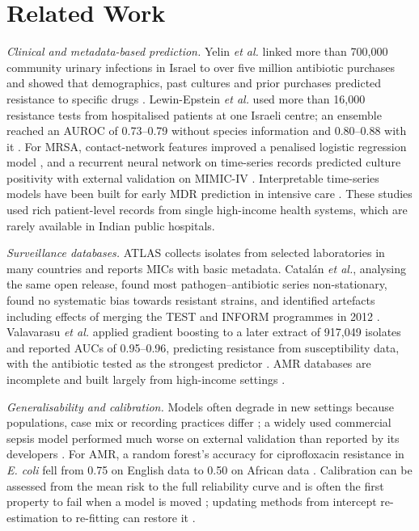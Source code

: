 \documentclass[conference]{IEEEtran}
\newcommand{\sci}[1]{\textit{#1}}
\begin{document}
\section{Related Work}\label{sec:related}
\textit{Clinical and metadata-based prediction.} Yelin \textit{et al.} linked more than 700{,}000 community urinary infections in Israel to over five million antibiotic purchases and showed that demographics, past cultures and prior purchases predicted resistance to specific drugs \cite{yelin2019}. Lewin-Epstein \textit{et al.} used more than 16{,}000 resistance tests from hospitalised patients at one Israeli centre; an ensemble reached an AUROC of 0.73--0.79 without species information and 0.80--0.88 with it \cite{lewinepstein2021}. For MRSA, contact-network features improved a penalised logistic regression model \cite{kamruzzaman2024}, and a recurrent neural network on time-series records predicted culture positivity with external validation on MIMIC-IV \cite{nigo2024}. Interpretable time-series models have been built for early MDR prediction in intensive care \cite{martinezaguero2022}. These studies used rich patient-level records from single high-income health systems, which are rarely available in Indian public hospitals.

\textit{Surveillance databases.} ATLAS collects isolates from selected laboratories in many countries and reports MICs with basic metadata. Catal\'an \textit{et al.}, analysing the same open release, found most pathogen--antibiotic series non-stationary, found no systematic bias towards resistant strains, and identified artefacts including effects of merging the TEST and INFORM programmes in 2012 \cite{catalan2022}. Valavarasu \textit{et al.} applied gradient boosting to a later extract of 917{,}049 isolates and reported AUCs of 0.95--0.96, predicting resistance from susceptibility data, with the antibiotic tested as the strongest predictor \cite{valavarasu2025}. AMR databases are incomplete and built largely from high-income settings \cite{centner2026}.

\textit{Generalisability and calibration.} Models often degrade in new settings because populations, case mix or recording practices differ \cite{finlayson2021}; a widely used commercial sepsis model performed much worse on external validation than reported by its developers \cite{wong2021}. For AMR, a random forest's accuracy for ciprofloxacin resistance in \sci{E. coli} fell from 0.75 on English data to 0.50 on African data \cite{nsubuga2024}. Calibration can be assessed from the mean risk to the full reliability curve \cite{vancalster2016} and is often the first property to fail when a model is moved \cite{vancalster2019}; updating methods from intercept re-estimation to re-fitting can restore it \cite{janssen2008,steyerberg2019}.
\end{document}
